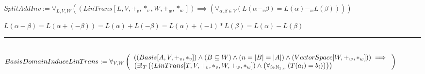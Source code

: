 \documentclass{book}
\newcommand{\abr}{:=}
\newcommand{\pr}[1]{\left(#1\right)}
\begin{document}
$SplitAddInv \abr \forall_{L, V, W}\pr{(LinTrans[L, V, +_v, *_v, W, +_w, *_w]) \implies \pr{\forall_{\alpha, \beta \in V}\pr{L(\alpha -_v \beta) = L(\alpha) -_w L(\beta)}}}$
\begin{enumerate}
  \lit $L(\alpha - \beta) = L\pr{\alpha + (-\beta)} = L(\alpha) + L(-\beta) = L(\alpha) + (-1) * L(\beta) = L(\alpha) - L(\beta)$
\end{enumerate} \vspace{.75mm} \hrule \vspace{.75mm} \ \\ 

$BasisDomainInduceLinTrans \abr \forall_{V, W}\left(\begin{array}{ll}
  \pr{(Basis[A, V, +_v, *_v]) \land (B \subseteq W) \land (n = |B| = |A|) \land (VectorSpace[W, +_w, *_w])} \hfill \implies \hfill \\
  \pr{\exists!_{T}\pr{(LinTrans[T, V, +_v, *_v, W, +_w, *_w]) \land \pr{\forall_{i \in \mathbb{N}_{1, n}}\pr{T(a_i) = b_i}}}}
\end{array}\right)$
\end{document}
